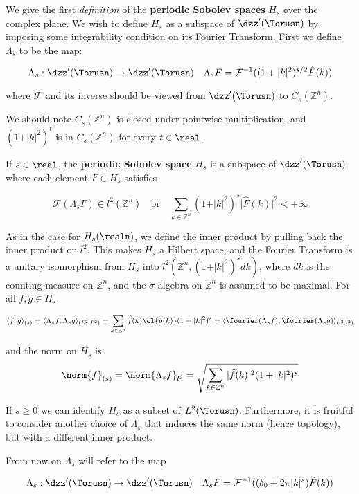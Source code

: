 We give the first \emph{definition} of the \textbf{periodic Sobolev
spaces} \(H_s\) over the complex plane. We wish to define \(H_s\) as a
subspace of \(\dzz'(\Torusn)\) by imposing some integrability condition
on its Fourier Transform. First we define \(\Lambda_s\) to be the map:

\[
\Lambda_s: \dzz'(\Torusn)\to \dzz'(\Torusn)\quad \Lambda_s F = \mathcal{F}^{-1}((1+\vert k\vert^2)^{s/2}\hat{F}(k))
\]

where \(\mathcal{F}\) and its inverse should be viewed from
\(\dzz'(\Torusn)\) to \(C_s(\mathbb{Z}^n)\).

We should note \(C_s(\mathbb{Z}^n)\) is closed under pointwise
multiplication, and \((1+\vert k\vert^2)^{t}\) is in
\(C_s(\mathbb{Z}^n)\) for every \(t\in\real\).

If \(s\in\real\), the \textbf{periodic Sobolev space} \(H_s\) is a
subspace of \(\dzz'(\Torusn)\) where each element \(F\in H_s\) satisfies

\[
\mathcal{F}(\Lambda_s F)\in l^2(\mathbb{Z}^n)\quad\text{or}\quad \sum_{k\in\mathbb{Z}^n}(1+\vert k\vert^2)^s\vert\hat{F}(k)\vert^2< +\infty
\]

As in the case for \(H_s(\realn)\), we define the inner product by
pulling back the inner product on \(l^2\). This makes \(H_s\) a Hilbert
space, and the Fourier Transform is a unitary isomorphism from \(H_s\)
into \(l^2(\mathbb{Z}^n, (1+\vert k\vert^2)^{s}dk)\), where \(dk\) is
the counting measure on \(\mathbb{Z}^n\), and the \(\sigma\)-algebra on
\(\mathbb{Z}^n\) is assumed to be maximal. For all \(f,g\in H_s\),

\[
\langle f,g\rangle_{(s)} = \langle \Lambda_s f,\Lambda_s g\rangle_{(L^2,L^2)} = \sum_{k\in\mathbb{Z}^n}\hat{f}(k)\cl{\hat{g}(k)}(1+\vert k \vert^2)^{s} = \langle \fourier(\Lambda_s f),\fourier(\Lambda_s g)\rangle_{(l^2,l^2)}
\]

and the norm on \(H_s\) is
\[\norm{f}_{(s)} = \norm{\Lambda_s f}_{l^2} =\sqrt{\sum_{k\in\mathbb{Z}^n}\vert\hat{f}(k)\vert^2(1+\vert k \vert^2)^s}\]

If \(s\geq 0\) we can identify \(H_s\) as a subset of \(L^2(\Torusn)\).
Furthermore, it is fruitful to consider another choice of \(\Lambda_s\)
that induces the same norm (hence topology), but with a different inner
product.

From now on \(\Lambda_s\) will refer to the map

\[
\Lambda_s: \dzz'(\Torusn)\to\dzz'(\Torusn)\quad\Lambda_s F = \mathcal{F}^{-1}( (\delta_0 + 2\pi \vert k\vert^{s})\hat{F}(k))
\]

